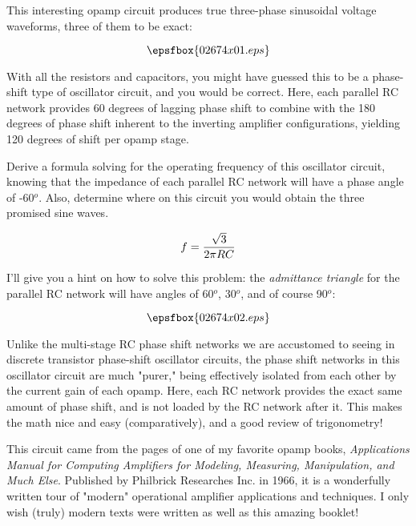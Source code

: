 

This interesting opamp circuit produces true three-phase sinusoidal voltage waveforms, three of them to be exact:

$$\epsfbox{02674x01.eps}$$

With all the resistors and capacitors, you might have guessed this to be a phase-shift type of oscillator circuit, and you would be correct.  Here, each parallel RC network provides 60 degrees of lagging phase shift to combine with the 180 degrees of phase shift inherent to the inverting amplifier configurations, yielding 120 degrees of shift per opamp stage.

Derive a formula solving for the operating frequency of this oscillator circuit, knowing that the impedance of each parallel RC network will have a phase angle of -60$^{o}$.  Also, determine where on this circuit you would obtain the three promised sine waves.







$$f = {{\sqrt{3}} \over {2 \pi R C}}$$

I'll give you a hint on how to solve this problem: the {\it admittance triangle} for the parallel RC network will have angles of 60$^{o}$, 30$^{o}$, and of course 90$^{o}$:

$$\epsfbox{02674x02.eps}$$







Unlike the multi-stage RC phase shift networks we are accustomed to seeing in discrete transistor phase-shift oscillator circuits, the phase shift networks in this oscillator circuit are much "purer," being effectively isolated from each other by the current gain of each opamp.  Here, each RC network provides the exact same amount of phase shift, and is not loaded by the RC network after it.  This makes the math nice and easy (comparatively), and a good review of trigonometry!

This circuit came from the pages of one of my favorite opamp books, {\it Applications Manual for Computing Amplifiers for Modeling, Measuring, Manipulation, and Much Else}.  Published by Philbrick Researches Inc. in 1966, it is a wonderfully written tour of "modern" operational amplifier applications and techniques.  I only wish (truly) modern texts were written as well as this amazing booklet!




